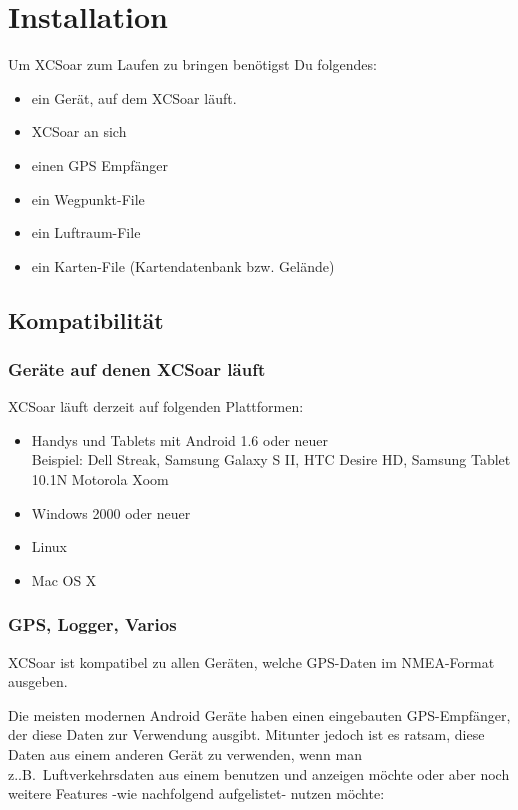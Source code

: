 \chapter{Installation}\label{cha:installation}

Um {\textsf  XCSoar} zum Laufen zu bringen benötigst Du folgendes:


\begin{itemize}
\item ein Gerät, auf dem {\textsf  XCSoar} läuft.
\item {\textsf  XCSoar} an sich
\item einen GPS Empfänger
\item ein Wegpunkt-File
\item ein Luftraum-File
\item ein Karten-File (Kartendatenbank bzw. Gelände)
\end{itemize}

\section{Kompatibilität}

\subsection*{Geräte auf denen  {\textsf  XCSoar} läuft}

{\textsf  XCSoar} läuft derzeit auf folgenden Plattformen:

\begin{itemize}
\item Handys und Tablets mit Android 1.6 oder neuer\\
  Beispiel: Dell Streak, Samsung Galaxy S II, HTC Desire HD, Samsung Tablet 10.1N
  Motorola Xoom
\item Windows 2000 oder neuer
\item Linux
\item Mac OS X
\end{itemize}

\subsection*{GPS, Logger, Varios}

{\textsf  XCSoar}  ist kompatibel zu allen Geräten, welche GPS-Daten im NMEA-Format ausgeben.

Die meisten modernen Android Geräte haben einen eingebauten GPS-Empfänger, der diese Daten zur Verwendung 
ausgibt. Mitunter jedoch ist es ratsam, diese Daten aus einem anderen Gerät zu verwenden, wenn man z..B.\ Luftverkehrsdaten aus einem 
\fl benutzen und anzeigen möchte oder aber noch weitere Features -wie nachfolgend aufgelistet- nutzen möchte:




